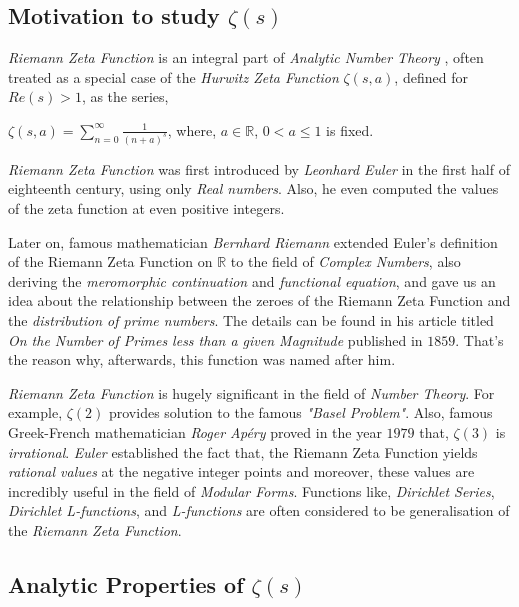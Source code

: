 \documentclass[article,12pt]{elsarticle}
\begin{document}
	\subsection{Motivation to study $\zeta(s)$}
	
	
	\textit{Riemann Zeta Function} \cite{1} is an integral part of \textit{Analytic Number Theory} \cite{3} \cite{4}, often treated as a special case of the \textit{Hurwitz Zeta Function} $\zeta(s,a)$, defined for $Re(s)>1$, as the series,
	\begin{center}
		$\zeta(s,a)=\sum\limits_{n=0}^{\infty}\frac{1}{(n+a)^s}$,               where, $a\in \mathbb{R}$, $0<a\leq 1$ is fixed.
	\end{center}
	\textit{Riemann Zeta Function} was first introduced by \textit{Leonhard Euler} in the first half of eighteenth century, using only \textit{Real numbers}. Also, he even computed the values of the zeta function at even positive integers.\par
	Later on, famous mathematician \textit{Bernhard Riemann} extended Euler's definition of the Riemann Zeta Function on $\mathbb{R}$ to the field of \textit{Complex Numbers}, also deriving the \textit{meromorphic continuation} and \textit{functional equation}, and gave us an idea about the relationship between the zeroes of the Riemann Zeta Function and the \textit{distribution of prime numbers}. The details can be found in his article titled \textit{On the Number of Primes less than a given Magnitude} published in $1859$. That's the reason why, afterwards, this function was named after him.\par 
	\textit{Riemann Zeta Function} is hugely significant in the field of \textit{Number Theory}. For example, $\zeta(2)$ provides solution to the famous \textit{"Basel Problem"}. Also, famous Greek-French mathematician \textit{Roger Ap\'{e}ry} proved in the year $1979$ that, $\zeta(3)$ is \textit{irrational}. \textit{Euler} established the fact that, the Riemann Zeta Function yields \textit{rational values} at the negative integer points and moreover, these values are incredibly useful in the field of \textit{Modular Forms}. Functions like, \textit{Dirichlet Series}, \textit{Dirichlet L-functions}, and \textit{L-functions} are often considered to be generalisation of the \textit{Riemann Zeta Function}.
	
	\subsection{Analytic Properties of $\zeta(s)$}
	
\end{document}
